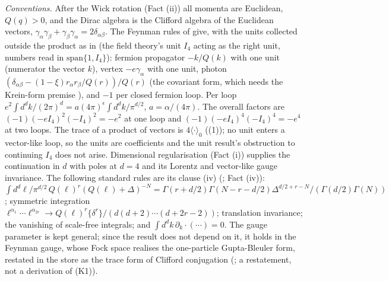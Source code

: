\emph{Conventions.} After the Wick rotation (Fact (ii)) all momenta are Euclidean, $Q(q) > 0$, and the Dirac algebra is the Clifford algebra of the Euclidean vectors, $\gamma_{\alpha}\gamma_{\beta} + \gamma_{\beta}\gamma_{\alpha} = 2\delta_{\alpha\beta}$. The Feynman rules of  give, with the units collected outside the product as in  (the field theory's unit $I_{4}$ acting as the right unit, numbers read in $\mathrm{span}\{1, I_{4}\}$): fermion propagator $-k/Q(k)$ with one unit (numerator the vector $k$), vertex $-e\gamma_{\alpha}$ with one unit, photon $(\delta_{\alpha\beta} - (1-\xi)r_{\alpha}r_{\beta}/Q(r))/Q(r)$ (the covariant form, which needs the Krein-form premise ), and $-1$ per closed fermion loop. Per loop $e^{2}\int d^{d}k/(2\pi)^{d} = a(4\pi)^{\epsilon}\int d^{d}k/\pi^{d/2}$, $a = \alpha/(4\pi)$. The overall factors are $(-1)(-eI_{4})^{2}(-I_{4})^{2} = -e^{2}$ at one loop and $(-1)(-eI_{4})^{4}(-I_{4})^{4} = -e^{4}$ at two loops. The trace of a product of vectors is $4\langle\cdot\rangle_{0}$ ((1)); no unit enters a vector-like loop, so the units are coefficients and the unit result's obstruction to continuing $I_{4}$ does not arise. Dimensional regularisation (Fact (i)) supplies the continuation in $d$ with poles at $d = 4$ and its Lorentz and vector-like gauge invariance. The following standard rules are its clause (iv) (\cite{ChetyrkinTkachov1981}; Fact (iv)): $\int d^{d}\ell/\pi^{d/2}\,Q(\ell)^{r}(Q(\ell) + \Delta)^{-N} = \Gamma(r + d/2)\Gamma(N - r - d/2)\Delta^{d/2 + r - N}/(\Gamma(d/2)\Gamma(N))$; symmetric integration $\ell^{\alpha_{1}}\cdots\ell^{\alpha_{2r}} \to Q(\ell)^{r}\{\delta^{r}\}/(d(d+2)\cdots(d+2r-2))$; translation invariance; the vanishing of scale-free integrals; and $\int d^{d}k\,\partial_{k}\cdot(\cdots) = 0$. The gauge parameter is kept general; since the result does not depend on it, it holds in the Feynman gauge, whose Fock space realises the one-particle Gupta-Bleuler form, restated in the store as the trace form of Clifford conjugation (; a restatement, not a derivation of (K1)).

